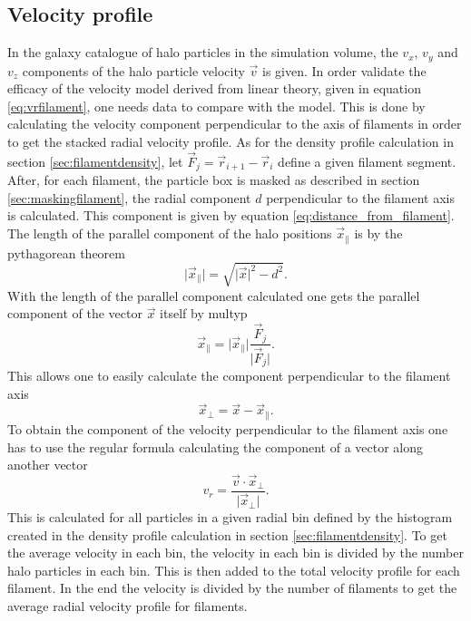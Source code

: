 \subsection{Velocity profile}\label{sec:numfilamentvelocity}
In the galaxy catalogue of halo particles in the simulation volume, the $v_x$,
$v_y$ and $v_z$ components of the halo particle velocity $\vec{v}$ is given. In order validate the efficacy of
the velocity model derived from linear theory, given in equation \ref{eq:vrfilament}, one
needs data to compare with the model. This is done by calculating the velocity component perpendicular to the axis of filaments in order to get the
stacked radial velocity profile. As for the density profile calculation in section
\ref{sec:filamentdensity}, let $\vec{F}_j=\vec{r}_{i+1} - \vec{r}_i$ define a given
filament segment. After, for each filament, the particle box is masked as
described in section \ref{sec:maskingfilament}, the radial component $d$
perpendicular to the filament axis is calculated. This component is given by equation \ref{eq:distance_from_filament}. The length of the parallel component of the
halo positions $\vec{x}_\parallel$ is by the pythagorean theorem
\begin{equation}
    \vert\vec{x}_\parallel\vert=\sqrt{\vert \vec{x}\vert^2-d^2}.
\end{equation}
With the length of the parallel component calculated one gets the parallel component of the vector $\vec{x}$ itself
by multyp
\begin{equation}
    \vec{x}_\parallel=\vert\vec{x}_\parallel\vert\frac{\vec{F}_j}{\vert\vec{F}_j\vert}.
\end{equation}
This allows one to easily calculate the component perpendicular to the filament
axis 
\begin{equation}
    \vec{x}_\perp=\vec{x}-\vec{x}_\parallel.
\end{equation}
To obtain the component of the velocity perpendicular to the filament axis one
has to use the regular formula calculating the component of a vector along
another vector
\begin{equation}
    v_r=\frac{\vec{v}\cdot\vec{x}_\perp}{\vert\vec{x}_\perp\vert}.
\end{equation}
This is calculated for all particles in a given radial bin defined by the
histogram created in the density profile calculation in section
\ref{sec:filamentdensity}. To get the average velocity in each bin, the velocity
in each bin is divided by the number halo particles in each bin. This is then
added to the total velocity profile for each filament. In the end the
velocity is divided by the number of filaments to get the average radial
velocity profile for filaments.
